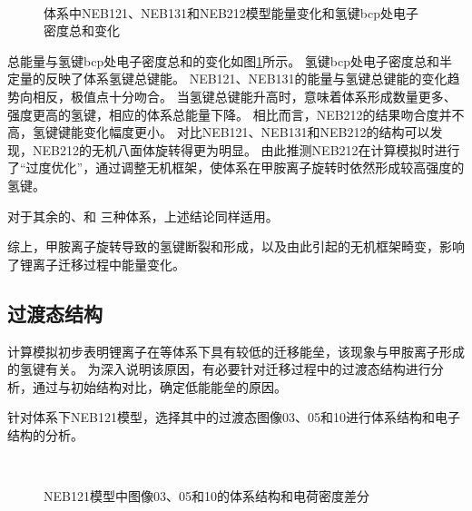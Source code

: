 \begin{figure}[htbp]
    \centering
     \\ 
    \caption{体系中NEB121、NEB131和NEB212模型能量变化和氢键bcp处电子密度总和变化}
    \label{fig:111-barrier-bcp}
\end{figure}

总能量与氢键bcp处电子密度总和的变化如图\ref{fig:111-barrier-bcp}所示。
氢键bcp处电子密度总和半定量的反映了体系氢键总键能。
NEB121、NEB131的能量与氢键总键能的变化趋势向相反，极值点十分吻合。
当氢键总键能升高时，意味着体系形成数量更多、强度更高的氢键，相应的体系总能量下降。
相比而言，NEB212的结果吻合度并不高，氢键键能变化幅度更小。
对比NEB121、NEB131和NEB212的结构可以发现，NEB212的无机八面体旋转得更为明显。
由此推测NEB212在计算模拟时进行了“过度优化”，通过调整无机框架，使体系在甲胺离子旋转时依然形成较高强度的氢键。

对于其余的、和 三种体系，上述结论同样适用。

综上，甲胺离子旋转导致的氢键断裂和形成，以及由此引起的无机框架畸变，影响了锂离子迁移过程中能量变化。

\subsection{过渡态结构}

计算模拟初步表明锂离子在等体系下具有较低的迁移能垒，该现象与甲胺离子形成的氢键有关。
为深入说明该原因，有必要针对迁移过程中的过渡态结构进行分析，通过与初始结构对比，确定低能能垒的原因。

针对体系下NEB121模型，选择其中的过渡态图像03、05和10进行体系结构和电子结构的分析。

\begin{figure}[htbp]
    \centering
     \\ 
    \caption{NEB121模型中图像03、05和10的体系结构和电荷密度差分}
    \label{fig:111-121-trans-contcar-diff}
\end{figure}

